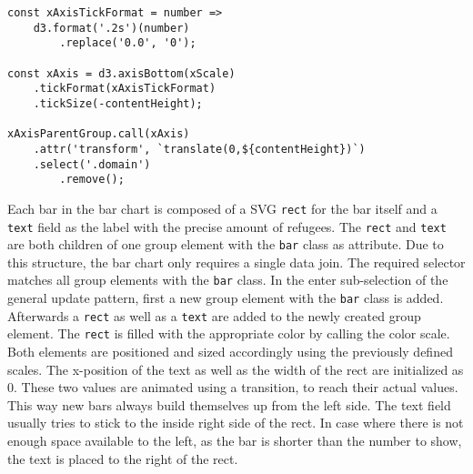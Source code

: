 \begin{minipage}{0.9\linewidth}
    \begin{lstlisting}[style=htmlCSSjs, captionpos=b, caption={The x axis implementation of the bar chart. The first constant defines the tick format. The provided '.2s' means that for each number there should be two significant digits. As the zero value is therefore represented as "0.0" to match the previous rule of two significant digits, it is simply replaced by "0". The second constant defines the function creating the axis. The previous tick format is passed here. Furthermore the \texttt{tickSize} is set to the height of the diagram. This way the initially small tick lines now cover the whole height of the diagram and allow for easier and more accurate readouts. Finally the \texttt{xAxisParentGroup} element, which is part of ther permantent hierarchical structure of the bar chart, calls the \texttt{xAxis} function. This adds the Axis to the diagram. As a last step the domain lines are selected and removed for styling reasons. (Section from \ref{app:bar-chart} lines 60ff)}, label={lst:bar-chart-axes}]
const xAxisTickFormat = number =>
    d3.format('.2s')(number)
        .replace('0.0', '0');

const xAxis = d3.axisBottom(xScale)
    .tickFormat(xAxisTickFormat)
    .tickSize(-contentHeight);

xAxisParentGroup.call(xAxis)
    .attr('transform', `translate(0,${contentHeight})`)
    .select('.domain')
        .remove();
    \end{lstlisting}
\end{minipage}

Each bar in the bar chart is composed of a SVG \texttt{rect} for the bar itself and a \texttt{text} field as the label with the precise amount of refugees. The \texttt{rect} and \texttt{text} are both children of one group element with the \texttt{bar} class as attribute. Due to this structure, the bar chart only requires a single data join. The required selector matches all group elements with the \texttt{bar} class. In the enter sub-selection of the general update pattern, first a new group element with the \texttt{bar} class is added. Afterwards a \texttt{rect} as well as a \texttt{text} are added to the newly created group element. The \texttt{rect} is filled with the appropriate color by calling the color scale. Both elements are positioned and sized accordingly using the previously defined scales. The x-position of the text as well as the width of the rect are initialized as 0. These two values are animated using a transition, to reach their actual values. This way new bars always build themselves up from the left side. The text field usually tries to stick to the inside right side of the rect. In case where there is not enough space available to the left, as the bar is shorter than the number to show, the text is placed to the right of the rect.

